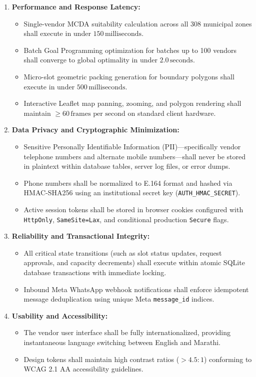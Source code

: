 \begin{enumerate}
    \item \textbf{Performance and Response Latency:}
    \begin{itemize}
        \item Single-vendor MCDA suitability calculation across all 308 municipal zones shall execute in under $150\,\text{milliseconds}$.
        \item Batch Goal Programming optimization for batches up to 100 vendors shall converge to global optimality in under $2.0\,\text{seconds}$.
        \item Micro-slot geometric packing generation for boundary polygons shall execute in under $500\,\text{milliseconds}$.
        \item Interactive Leaflet map panning, zooming, and polygon rendering shall maintain $\ge 60\,\text{frames per second}$ on standard client hardware.
    \end{itemize}
    
    \item \textbf{Data Privacy and Cryptographic Minimization:}
    \begin{itemize}
        \item Sensitive Personally Identifiable Information (PII)---specifically vendor telephone numbers and alternate mobile numbers---shall never be stored in plaintext within database tables, server log files, or error dumps.
        \item Phone numbers shall be normalized to E.164 format and hashed via HMAC-SHA256 using an institutional secret key (\texttt{AUTH\_HMAC\_SECRET}).
        \item Active session tokens shall be stored in browser cookies configured with \texttt{HttpOnly}, \texttt{SameSite=Lax}, and conditional production \texttt{Secure} flags.
    \end{itemize}
    
    \item \textbf{Reliability and Transactional Integrity:}
    \begin{itemize}
        \item All critical state transitions (such as slot status updates, request approvals, and capacity decrements) shall execute within atomic SQLite database transactions with immediate locking.
        \item Inbound Meta WhatsApp webhook notifications shall enforce idempotent message deduplication using unique Meta \texttt{message\_id} indices.
    \end{itemize}
    
    \item \textbf{Usability and Accessibility:}
    \begin{itemize}
        \item The vendor user interface shall be fully internationalized, providing instantaneous language switching between English and Marathi.
        \item Design tokens shall maintain high contrast ratios ($> 4.5:1$) conforming to WCAG 2.1 AA accessibility guidelines.
    \end{itemize}
\end{enumerate}

